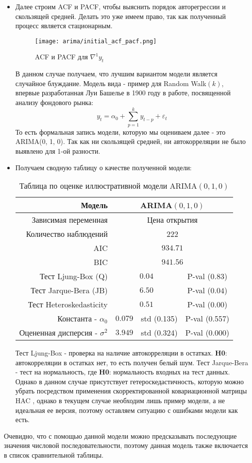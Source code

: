 \begin{itemize}
		\item Далее строим ACF и PACF, чтобы выяснить порядок авторегрессии и скользящей средней. Делать это уже имеем право, так как полученный процесс является стационарным.
		\begin{figure}[H]
			\centering
			\texttt{[image: arima/initial\_acf\_pacf.png]}
			\caption{ACF и PACF для $\nabla^1y_t$}
		\end{figure}
		В данном случае получаем, что лучшим вариантом модели является случайное блуждание. Модель вида  - пример для Random Walk$(k)$, впервые разработанная Луи Башелье \cite{fama_market_efficiency} в 1900 году в работе, посвященной анализу фондового рынка:
		\begin{equation}
			y_t = \alpha_0 + \sum_{p = 1}^k y_{t - p} + \varepsilon_{t}
		\end{equation}
		То есть формальная запись модели, которую мы оцениваем далее - это ARIMA(0, 1, 0). Так как ни скользящей средней, ни автокорреляции не было выявлено для 1-ой разности.
		
		\item Получаем сводную таблицу о качестве полученной модели:
		\begin{table}[H]
			\centering
			\begin{tabular}{r|ccc}
				\toprule
				Модель & \multicolumn{3}{c}{ARIMA$(0, 1, 0)$}\\
				\midrule[0.02cm]
				Зависимая переменная & \multicolumn{3}{c}{Цена открытия}\\
				Количество наблюдений & \multicolumn{3}{c}{222} \\
				AIC & \multicolumn{3}{c}{$934.71$} \\
				BIC & \multicolumn{3}{c}{$941.56$} \\
				\midrule[0.02cm]
				Тест Ljung-Box (Q) & \multicolumn{2}{c}{$0.04$} & P-val ($0.83$)\\
				Тест Jarque-Bera (JB) & \multicolumn{2}{c}{$6.50$} & P-val ($0.04$)\\
				Тест Heteroskedasticity & \multicolumn{2}{c}{$0.51$} & P-val ($0.00$)\\
				\midrule[0.02cm]
				Константа - $\alpha_0$ & $0.079$ & std (0.135) & P-val (0.557)\\
				Оцененная дисперсия - $\sigma^2$ & $3.949$ & std (0.324) & P-val (0.000)\\
				\midrule[0.02cm]
			\end{tabular}
			\caption{Таблица по оценке иллюстративной модели ARIMA$(0,1,0)$}
		\end{table}
		Тест Ljung-Box \cite{ljung_box_test} - проверка на наличие автокорреляции в остатках. \textbf{H0}: автокорреляции в остатках нет, то есть получен белый шум. Тест Jarque-Bera \cite{jarque_bera_test}- тест на нормальность, где \textbf{H0}: нормальность входных на тест данных. Однако в данном случае присутствует гетероскедастичность, которую можно убрать посредством применения скорректированной ковариационной матрицы HAC \cite{hac_standard_errors}, однако в текущем случае необходим лишь пример модели, а не идеальная ее версия, поэтому оставляем ситуацию с ошибками модели как есть. 
	\end{itemize}	

	Очевидно, что с помощью данной модели можно предсказывать последующие значения числовой последовательности, поэтому данная модель также включается в список сравнительной таблицы. 